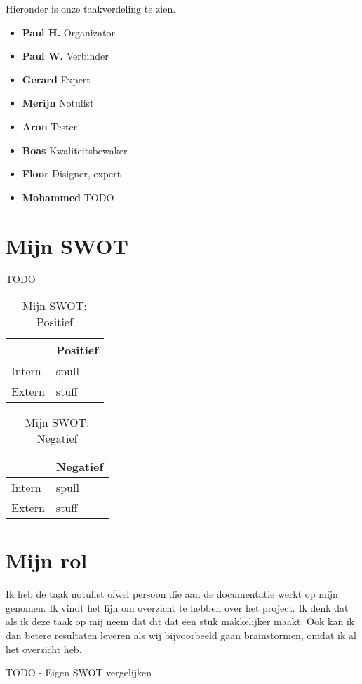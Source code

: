 \documentclass{article}
\begin{document}
Hieronder is onze taakverdeling te zien.

\begin{itemize}
  \item \textbf{Paul H.}  Organizator
  \item \textbf{Paul W.}  Verbinder 
  \item \textbf{Gerard} Expert 
  \item \textbf{Merijn} Notulist
  \item \textbf{Aron} Tester
  \item \textbf{Boas} Kwaliteitsbewaker 
  \item \textbf{Floor} Disigner, expert
  \item \textbf{Mohammed} TODO
\end{itemize}

\section{Mijn SWOT}

TODO

\begin{table}[h!]
\caption{Mijn SWOT: Positief}
\label{tab: Mijn SWOT: Positief}
\begin{tabular}{l|l}
        & \textbf{Positief} \\
        \hline
        {Intern} 	& spull \\ 
        {Extern}	& stuff \\ 
\end{tabular}
\end{table}

\begin{table}[h!]
\caption{Mijn SWOT: Negatief}
\label{tab: Mijn SWOT: Negatief}
\begin{tabular}{l|l}
        & \textbf{Negatief} \\
        \hline
        {Intern} 	& spull \\ 
        {Extern}	& stuff \\ 
\end{tabular}
\end{table}
\section{Mijn rol}

Ik heb de taak notulist ofwel persoon die aan de documentatie werkt op mijn genomen.
Ik vindt het fijn om overzicht te hebben over het project.
Ik denk dat als ik deze taak op mij neem dat dit dat een stuk makkelijker maakt.
Ook kan ik dan betere resultaten leveren als wij bijvoorbeeld gaan brainstormen, omdat ik al het overzicht heb.

TODO - Eigen SWOT vergelijken
\end{document}
